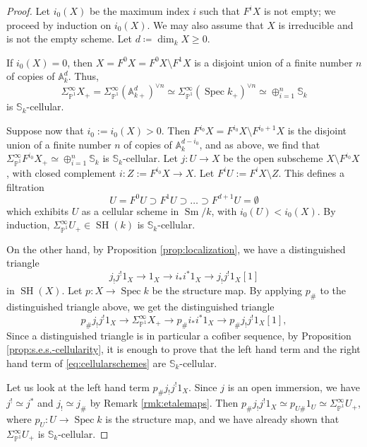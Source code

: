 \documentclass[10pt]{amsart}
\theoremstyle{definition}
\theoremstyle{plain}
\numberwithin{equation}{section}
\newcommand{\0}{\emptyset}
\newcommand{\A}{{\mathbb A}}
\renewcommand{\P}{{\mathbb P}}
\newcommand{\Spec}{{\operatorname{Spec}}}
\newcommand{\SH}{{\operatorname{SH}}}
\newcommand{\Sm}{{\operatorname{Sm}}}
\renewcommand{\dim}{{\operatorname{dim}}}
\begin{document}
\begin{proof} Let $i_0(X)$ be the maximum index $i$ such that $F^iX$ is not empty; we proceed by induction on $i_0(X)$. We may also assume that $X$ is irreducible and is not the empty scheme. Let $d \coloneqq \dim_kX\ge0$.

If $i_0(X)=0$, then $X=F^0X=F^0X \setminus F^1X$ is a disjoint union of a finite number $n$ of copies of $\A^d_k$. Thus,
$$\Sigma_{\P^1}^\infty X_+ = \Sigma_{\P^1}^\infty (\A^d _{k+})^{\vee n} \simeq\Sigma_{\P^1}^\infty (\Spec k _+)^{\vee n} \simeq \oplus_{i=1}^n \mathbb{S}_k$$
is $\mathbb{S}_k$-cellular.

Suppose now that $i_0:=i_0(X)>0$. Then $F^{i_0}X=F^{i_0}X\setminus F^{i_0+1}X$ is the disjoint union of a finite number $n$ of copies of $\A^{d-i_0}_k$, and as above, we find that $\Sigma_{\P^1}^\infty F^{i_0}X_+\simeq \oplus_{i=1}^n \mathbb{S}_k$ is $\mathbb{S}_k$-cellular. Let $j:U\to X$ be the open subscheme $X\setminus F^{i_0}X$, with closed complement $i:Z:=F^{i_0}X\to X$. Let $F^iU:= F^iX\setminus Z$. This defines a filtration
$$U=F^0U\supset F^1U\supset\ldots\supset F^{d+1}U=\0$$
which exhibits $U$ as a cellular scheme in $\Sm/k$, with $i_0(U)<i_0(X)$. By induction, $\Sigma_{\P^1}^\infty U_+ \in \SH(k)$ is $\mathbb{S}_k$-cellular.

On the other hand, by Proposition \ref{prop:localization}, we have a distinguished triangle
    $$j_!j^!1_X \to 1_X \to i_*i^* 1_X \to j_!j^!1_X[1]$$
    in $\SH(X)$. Let $p:X \to \Spec k$ be the structure map. By applying $p_\#$ to the distinguished triangle above, we get the distinguished triangle
    \begin{equation}
    \label{eq:cellularschemes}
        p_\# j_! j^! 1_X \to \Sigma_{\P^1}^\infty X_+ \to p_\#i_*i^*1_X \to  p_\# j_! j^! 1_X[1],
    \end{equation}
      Since a distinguished triangle is in particular a cofiber sequence, by Proposition \ref{prop:s.e.s.-cellularity}, it is enough to prove that the left hand term and the right hand term of \eqref{eq:cellularschemes} are $\mathbb{S}_k$-cellular.

    Let us look at the left hand term $p_\# j_! j^! 1_X$. Since $j$ is an open immersion, we have $j^! \simeq j^*$ and $j_! \simeq j_\#$ by Remark \ref{rmk:etalemaps}. Then $p_\# j_! j^! 1_X \simeq p_{U\#}1_U \simeq \Sigma_{\P^1}^\infty U_+$, where $p_U:U \to \Spec k$ is the structure map, and we have already shown that $\Sigma^\infty_{\P^1}U_+$ is $\mathbb{S}_k$-cellular.


\end{proof}
\end{document}
